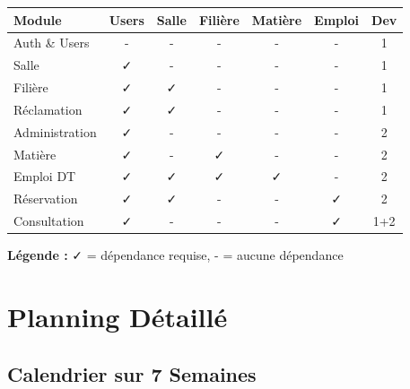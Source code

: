 \documentclass[12pt,a4paper]{article}
\begin{document}
\begin{center}
\begin{tabular}{|l|c|c|c|c|c|c|}
\hline
\textbf{Module} & \textbf{Users} & \textbf{Salle} & \textbf{Filière} & \textbf{Matière} & \textbf{Emploi} & \textbf{Dev} \\
\hline
Auth \& Users & - & - & - & - & - & 1 \\
\hline
Salle & ✓ & - & - & - & - & 1 \\
\hline
Filière & ✓ & ✓ & - & - & - & 1 \\
\hline
Réclamation & ✓ & ✓ & - & - & - & 1 \\
\hline
Administration & ✓ & - & - & - & - & 2 \\
\hline
Matière & ✓ & - & ✓ & - & - & 2 \\
\hline
Emploi DT & ✓ & ✓ & ✓ & ✓ & - & 2 \\
\hline
Réservation & ✓ & ✓ & - & - & ✓ & 2 \\
\hline
Consultation & ✓ & - & - & - & ✓ & 1+2 \\
\hline
\end{tabular}
\end{center}

\textbf{Légende :} ✓ = dépendance requise, - = aucune dépendance

\newpage

\section{Planning Détaillé}

\subsection{Calendrier sur 7 Semaines}
\end{document}
